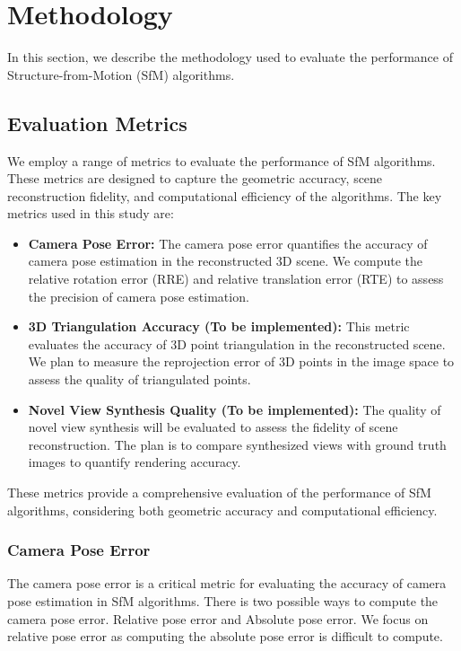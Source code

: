 \section{Methodology}\label{sec:methodology}

In this section, we describe the methodology used to evaluate the performance of Structure-from-Motion (SfM) algorithms.

\subsection{Evaluation Metrics}

We employ a range of metrics to evaluate the performance of SfM algorithms.
These metrics are designed to capture the geometric accuracy, scene reconstruction fidelity, and computational efficiency of the algorithms.
The key metrics used in this study are:
\begin{itemize}
    \item \textbf{Camera Pose Error:} The camera pose error quantifies the accuracy of camera pose estimation in the reconstructed 3D scene. 
    We compute the relative rotation error (RRE) and relative translation error (RTE) to assess the precision of camera pose estimation.
    \item \textbf{3D Triangulation Accuracy (To be implemented):} This metric evaluates the accuracy of 3D point triangulation in the reconstructed scene. 
    We plan to measure the reprojection error of 3D points in the image space to assess the quality of triangulated points.
    \item \textbf{Novel View Synthesis Quality (To be implemented):} The quality of novel view synthesis will be evaluated to assess the fidelity of scene reconstruction. 
    The plan is to compare synthesized views with ground truth images to quantify rendering accuracy.
\end{itemize}

These metrics provide a comprehensive evaluation of the performance of SfM algorithms, considering both geometric accuracy and computational efficiency.

\subsubsection{Camera Pose Error}
The camera pose error is a critical metric for evaluating the accuracy of camera pose estimation in SfM algorithms.
There is two possible ways to compute the camera pose error. Relative pose error and Absolute pose error.
We focus on relative pose error as computing the absolute pose error is difficult to compute.

